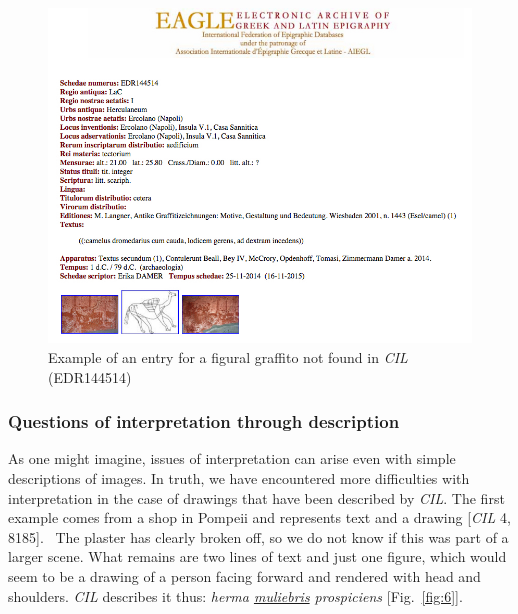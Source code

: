 \documentclass[amsthm,ebook]{saparticle}
\begin{document}
\begin{figure}[!hbp]
\centering
 \includegraphics[width=\columnwidth]{EAGLE2016BenefielSypniewski-img005.jpg}
\caption{Example of an entry for a figural graffito not found in \emph{CIL} (EDR144514)}
\label{fig:5}
\end{figure}



\subsubsection{Questions of interpretation through description}


As one might imagine, issues of interpretation can arise even with simple descriptions of images. In truth, we have
encountered more difficulties with interpretation in the case of drawings that have been described by \emph{CIL}. The first
example comes from a shop in Pompeii and represents text and a drawing [\emph{CIL} 4, 8185]. \ The plaster has clearly broken
off, so we do not know if this was part of a larger scene. What remains are two lines of text and just one figure,
which would seem to be a drawing of a person facing forward and rendered with head and shoulders. \emph{CIL} describes it
thus: \emph{herma \underline{muliebris} prospiciens} [Fig.~\ref{fig:6}].
\newpage
\end{document}
